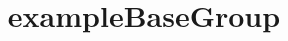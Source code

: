 \documentclass{test}
\begin{document}
\title{exampleBaseGroup} \maketitle \noindent




\end{document}
